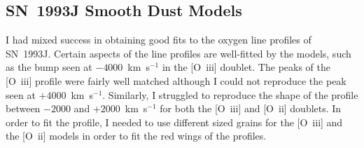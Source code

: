 \subsection{SN~1993J Smooth Dust Models}
I had mixed success in obtaining good fits to the oxygen line profiles of SN~1993J.  Certain aspects of the line profiles are well-fitted by the models, such as the bump seen at $-4000$~km~s$^{-1}$ in the [O~{\sc iii}] doublet.  The peaks of the [O~{\sc iii}] profile were fairly well matched although I could not reproduce the peak seen at $+4000$~km~s$^{-1}$.  Similarly, I struggled to reproduce the shape of the profile between $-2000$ and $+2000$~km~s$^{-1}$ for both the [O~{\sc iii}] and [O~{\sc ii}] doublets.  In order to fit the profile, I needed to use different sized grains for the [O~{\sc iii}] and the [O~{\sc ii}] models in order to fit the red wings of the profiles.

